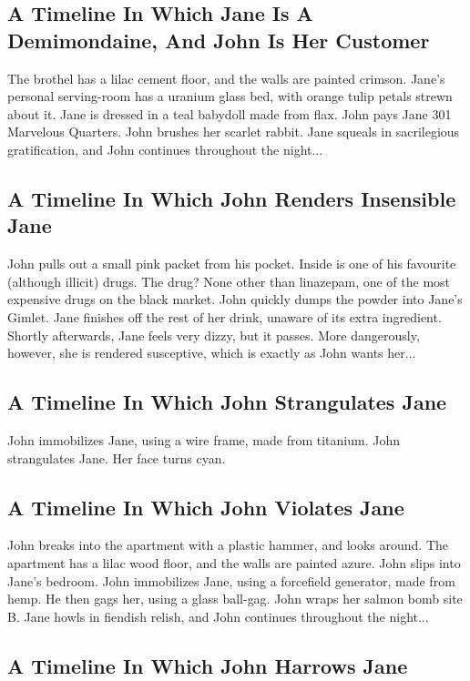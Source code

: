 \documentclass{article}
\begin{document}
\subsection{A Timeline In Which Jane Is A Demimondaine, And John Is Her Customer}


The brothel has a lilac cement floor, and the walls are painted crimson.
Jane's personal serving{-}room has a uranium glass bed, with orange tulip petals strewn about it.
Jane is dressed in a teal babydoll made from flax.
John pays Jane 301 Marvelous Quarters.
John brushes her scarlet rabbit.
Jane squeals in sacrilegious gratification, and John continues throughout the night...
\subsection{A Timeline In Which John Renders Insensible Jane}


John pulls out a small pink packet from his pocket. Inside is one of his favourite (although illicit) drugs.
The drug? None other than linazepam, one of the most expensive drugs on the black market.
John quickly dumps the powder into Jane's Gimlet.
Jane finishes off the rest of her drink, unaware of its extra ingredient.
Shortly afterwards, Jane feels very dizzy, but it passes.
More dangerously, however, she is rendered susceptive, which is exactly as John wants her...
\subsection{A Timeline In Which John Strangulates Jane}


John immobilizes Jane, using a wire frame, made from titanium.
John strangulates Jane.
Her face turns cyan.
\subsection{A Timeline In Which John Violates Jane}


John breaks into the apartment with a plastic hammer, and looks around.
The apartment has a lilac wood floor, and the walls are painted azure.
John slips into Jane's bedroom.
John immobilizes Jane, using a forcefield generator, made from hemp.
He then gags her, using a glass ball{-}gag.
John wraps her salmon bomb site B.
Jane howls in fiendish relish, and John continues throughout the night...
\subsection{A Timeline In Which John Harrows Jane}
\end{document}
